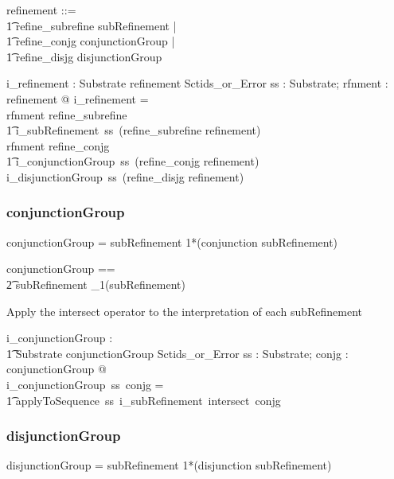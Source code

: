 \documentclass{article}
\def\bnf#1{{\scriptsize {{#1}} }}
\begin{document}
\begin{zed}
refinement ::= \\
\t1 refine\_subrefine \ldata subRefinement \rdata | \\
\t1 refine\_conjg \ldata conjunctionGroup \rdata | \\
\t1 refine\_disjg \ldata disjunctionGroup \rdata
\end{zed}

\begin{gendef}
   i\_refinement : Substrate \fun refinement \fun Sctids\_or\_Error
\where
   \forall ss : Substrate; rfnment : refinement @ i\_refinement = \\
   \IF rfnment \in \ran refine\_subrefine \\
\t1 \THEN i\_subRefinement~ss~(refine\_subrefine \inv refinement) \\
   \ELSE \IF rfnment \in \ran refine\_conjg \\
\t1 \THEN i\_conjunctionGroup~ss~(refine\_conjg \inv refinement) \\
   \ELSE i\_disjunctionGroup~ss~(refine\_disjg \inv refinement)
\end{gendef}

\subsubsection{conjunctionGroup}
\begin{framed}
\noindent
\bnf{conjunctionGroup = subRefinement 1*(conjunction subRefinement)}
\end{framed}

\begin{zed}
conjunctionGroup == \\
\t2 subRefinement \cross \seq_1(subRefinement)
\end{zed}

Apply the intersect operator to the interpretation of each  subRefinement

\begin{gendef}
    i\_conjunctionGroup : \\
\t1 Substrate \fun conjunctionGroup \fun Sctids\_or\_Error
\where
   \forall ss : Substrate;  conjg : conjunctionGroup @ \\
i\_conjunctionGroup~ss~conjg = \\
\t1 applyToSequence~ss~i\_subRefinement~intersect~conjg
\end{gendef}


\subsubsection{disjunctionGroup}
\begin{framed}
\noindent
\bnf{disjunctionGroup = subRefinement 1*(disjunction subRefinement)}
\end{framed}
\end{document}
